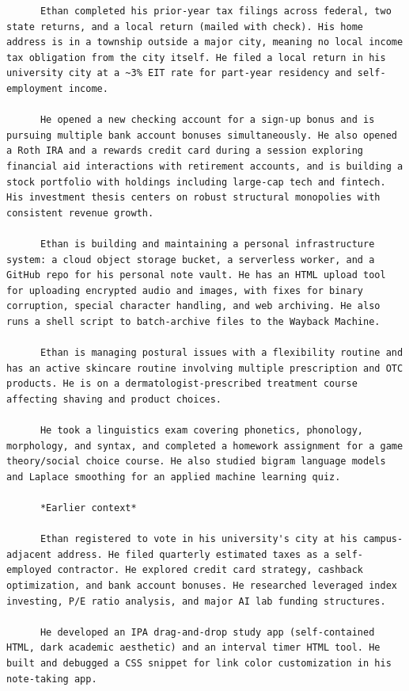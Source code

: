 \documentclass[10pt,letterpaper,twocolumn]{article}
\begin{document}
\begin{promptbox}
\begin{Verbatim}
      Ethan completed his prior-year tax filings across federal, two state returns, and a local return (mailed with check). His home address is in a township outside a major city, meaning no local income tax obligation from the city itself. He filed a local return in his university city at a ~3% EIT rate for part-year residency and self-employment income.

      He opened a new checking account for a sign-up bonus and is pursuing multiple bank account bonuses simultaneously. He also opened a Roth IRA and a rewards credit card during a session exploring financial aid interactions with retirement accounts, and is building a stock portfolio with holdings including large-cap tech and fintech. His investment thesis centers on robust structural monopolies with consistent revenue growth.

      Ethan is building and maintaining a personal infrastructure system: a cloud object storage bucket, a serverless worker, and a GitHub repo for his personal note vault. He has an HTML upload tool for uploading encrypted audio and images, with fixes for binary corruption, special character handling, and web archiving. He also runs a shell script to batch-archive files to the Wayback Machine.

      Ethan is managing postural issues with a flexibility routine and has an active skincare routine involving multiple prescription and OTC products. He is on a dermatologist-prescribed treatment course affecting shaving and product choices.

      He took a linguistics exam covering phonetics, phonology, morphology, and syntax, and completed a homework assignment for a game theory/social choice course. He also studied bigram language models and Laplace smoothing for an applied machine learning quiz.

      *Earlier context*

      Ethan registered to vote in his university's city at his campus-adjacent address. He filed quarterly estimated taxes as a self-employed contractor. He explored credit card strategy, cashback optimization, and bank account bonuses. He researched leveraged index investing, P/E ratio analysis, and major AI lab funding structures.

      He developed an IPA drag-and-drop study app (self-contained HTML, dark academic aesthetic) and an interval timer HTML tool. He built and debugged a CSS snippet for link color customization in his note-taking app.


\end{Verbatim}
\end{promptbox}
\end{document}
